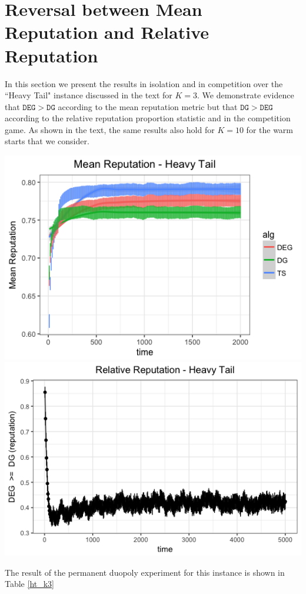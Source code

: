 \documentclass[11pt,letterpaper]{article}
\theoremstyle{definition}
\newcommand{\term}[1]{\ensuremath{\mathtt{#1}}\xspace}
\newcommand{\DEG}{\term{DEG}}
\newcommand{\DG}{\term{DG}}
\begin{document}
\section{Reversal between Mean Reputation and Relative Reputation}

In this section we present the results in isolation and in competition over the ``Heavy Tail" instance discussed in the text for $K = 3$. We demonstrate evidence that $\DEG > \DG$ according to the mean reputation metric but that $\DG > \DEG$ according to the relative reputation proportion statistic and in the competition game. As shown in the text, the same results also hold for $K = 10$ for the warm starts that we consider.

\begin{center}
\includegraphics[scale=0.35]{figures/mean_ht_3_arms} \\
\includegraphics[scale=0.35]{figures/rel_rep_ht_3_arms}
\end{center}

The result of the permanent duopoly experiment for this instance  is shown in Table \ref{ht_k3}
\end{document}
